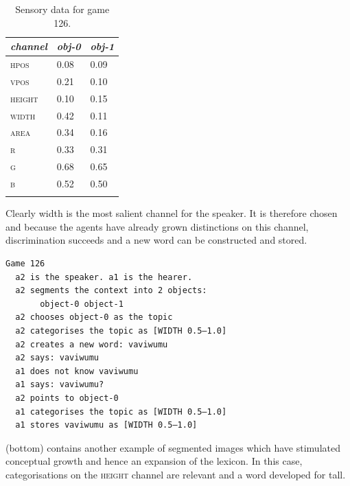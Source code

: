 \begin{table}
\begin{center}
\begin{tabular}{lll}
\lsptoprule
{\itshape channel}& {\itshape obj-0} & {\itshape obj-1}\\ \midrule
\textsc{hpos} & 0.08 & 0.09\\ 
\textsc{vpos} & 0.21 & 0.10\\ 
\textsc{height} & 0.10 & 0.15\\ 
\textsc{width} & 0.42 & 0.11\\ 
\textsc{area} & 0.34 & 0.16\\ 
\textsc{r} & 0.33 & 0.31\\ 
\textsc{g} & 0.68 & 0.65\\ 
\textsc{b} & 0.52 & 0.50\\ 
\lspbottomrule
\end{tabular}
\caption{\label{tab:game126}Sensory data for game 126.}
\end{center}
\end{table}
Clearly width is the most salient channel for the speaker. 
It is therefore chosen and because the 
agents have already grown distinctions on this channel, 
discrimination succeeds and a new word can be
constructed and stored. 
\begin{verbatim}
Game 126 
  a2 is the speaker. a1 is the hearer. 
  a2 segments the context into 2 objects: 
       object-0 object-1
  a2 chooses object-0 as the topic 
  a2 categorises the topic as [WIDTH 0.5–1.0]
  a2 creates a new word: vaviwumu
  a2 says: vaviwumu
  a1 does not know vaviwumu
  a1 says: vaviwumu?
  a2 points to object-0
  a1 categorises the topic as [WIDTH 0.5–1.0]
  a1 stores vaviwumu as [WIDTH 0.5–1.0]
\end{verbatim}
 (bottom) contains another example
of segmented images which have stimulated conceptual
growth and hence an expansion of the lexicon. 
In this case, categorisations on the \textsc{height} channel are
relevant and a word developed for tall.

